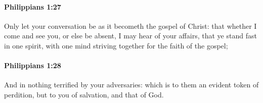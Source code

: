		\paragraph{Philippians 1:27} %
			\label{PHILIPPIANS-1-27}

			Only let your conversation be as it becometh the gospel of Christ: that whether I come and see you, or else be absent, I may hear of your affairs, that ye stand fast in one spirit, with one mind striving together for the faith of the gospel;

			\begin{framed}
			\scriptsize
				\begin{compactdesc}
					\item[SBLG] 
				\end{compactdesc}
			\end{framed}

		\paragraph{Philippians 1:28} %
			\label{PHILIPPIANS-1-28}

			And in nothing terrified by your adversaries: which is to them an evident token of perdition, but to you of salvation, and that of God.


